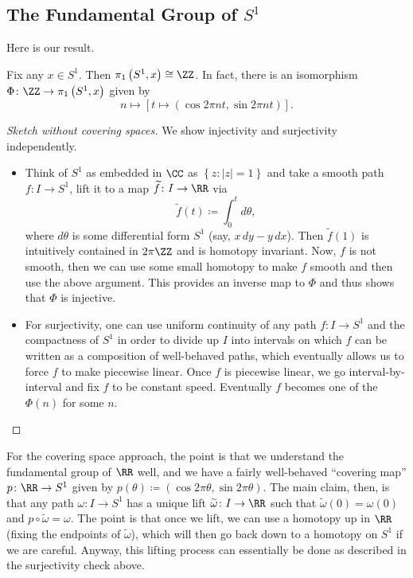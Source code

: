 \documentclass[../notes.tex]{subfiles}
\begin{document}
\subsection{The Fundamental Group of \texorpdfstring{$S^1$}{S1}}
Here is our result.
\begin{theorem}
	Fix any $x\in S^1$. Then $\pi_1\left(S^1,x\right)\cong\ZZ$. In fact, there is an isomorphism $\Phi\colon\ZZ\to\pi_1\left(S^1,x\right)$ given by
	\[n\mapsto\left[t\mapsto\left(\cos2\pi nt,\sin2\pi nt\right)\right].\]
\end{theorem}
\begin{proof}[Sketch without covering spaces]
	We show injectivity and surjectivity independently.
	\begin{itemize}
		\item Think of $S^1$ as embedded in $\CC$ as $\left\{z:\left|z\right|=1\right\}$ and take a smooth path $f\colon I\to S^1$, lift it to a map $\widetilde f\colon I\to\RR$ via
		\[\widetilde f(t)\coloneqq\int_0^td\theta,\]
		where $d\theta$ is some differential form $S^1$ (say, $x\,dy-y\,dx$). Then $\widetilde f(1)$ is intuitively contained in $2\pi\ZZ$ and is homotopy invariant. Now, $f$ is not smooth, then we can use some small homotopy to make $f$ smooth and then use the above argument. This provides an inverse map to $\Phi$ and thus shows that $\Phi$ is injective.
		\item For surjectivity, one can use uniform continuity of any path $f\colon I\to S^1$ and the compactness of $S^1$ in order to divide up $I$ into intervals on which $f$ can be written as a composition of well-behaved paths, which eventually allows us to force $f$ to make piecewise linear. Once $f$ is piecewise linear, we go interval-by-interval and fix $f$ to be constant speed. Eventually $f$ becomes one of the $\Phi(n)$ for some $n$.
		\qedhere
	\end{itemize}
\end{proof}
For the covering space approach, the point is that we understand the fundamental group of $\RR$ well, and we have a fairly well-behaved ``covering map'' $p\colon\RR\to S^1$ given by $p(\theta)\coloneqq(\cos2\pi\theta,\sin2\pi\theta)$. The main claim, then, is that any path $\omega\colon I\to S^1$ has a unique lift $\widetilde\omega\colon I\to\RR$ such that $\widetilde\omega(0)=\omega(0)$ and $p\circ\widetilde\omega=\omega$. The point is that once we lift, we can use a homotopy up in $\RR$ (fixing the endpoints of $\widetilde\omega$), which will then go back down to a homotopy on $S^1$ if we are careful. Anyway, this lifting process can essentially be done as described in the surjectivity check above.
\end{document}
